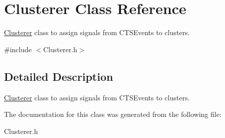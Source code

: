 \hypertarget{classClusterer}{}\section{Clusterer Class Reference}
\label{classClusterer}


\hyperlink{classClusterer}{Clusterer} class to assign signals from C\+T\+S\+Events to clusters.  




{\ttfamily \#include $<$Clusterer.\+h$>$}



\subsection{Detailed Description}
\hyperlink{classClusterer}{Clusterer} class to assign signals from C\+T\+S\+Events to clusters. 

The documentation for this class was generated from the following file\+:\begin{DoxyCompactItemize}
\item 
Clusterer.\+h\end{DoxyCompactItemize}
